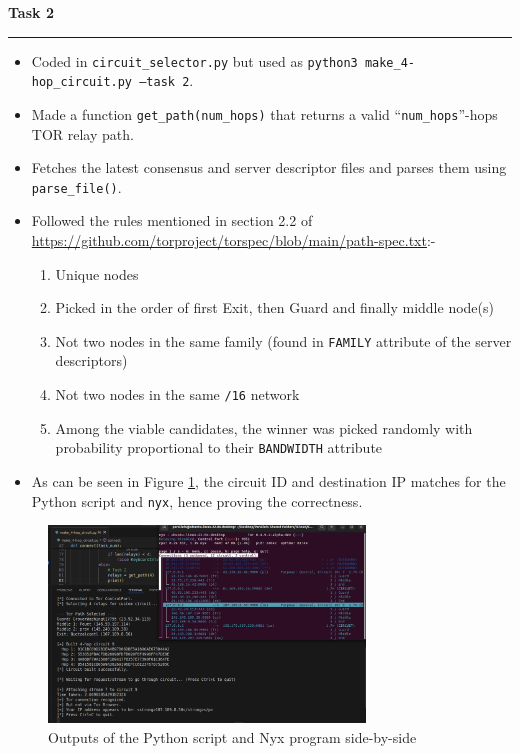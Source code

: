 \documentclass[a4paper,12pt]{article}
\newenvironment{solution}[2][]{%
\begin{mdframed}[linecolor=blue!70!black, linewidth=2pt, roundcorner=10pt, backgroundcolor=yellow!10!white, skipabove=12pt, skipbelow=12pt]%
	\textbf{\large #2}
	\par\noindent\rule{\textwidth}{0.4pt}
}{
\end{mdframed}
}
\begin{document}
\begin{solution}{Task 2}
    \begin{itemize}
        \item Coded in \texttt{circuit\_selector.py} but used as \texttt{python3 make\_4-hop\_circuit.py --task 2}.
        \item Made a function \texttt{get\_path(num\_hops)} that returns a valid ``\texttt{num\_hops}''-hops TOR relay path.
        \item Fetches the latest consensus and server descriptor files and parses them using \texttt{parse\_file()}.
        \item Followed the rules mentioned in section 2.2 of \url{https://github.com/torproject/torspec/blob/main/path-spec.txt}:-
        \begin{enumerate}
            \item Unique nodes
            \item Picked in the order of first Exit, then Guard and finally middle node(s)
            \item Not two nodes in the same family (found in \texttt{FAMILY} attribute of the server descriptors)
            \item Not two nodes in the same \texttt{/16} network
            \item Among the viable candidates, the winner was picked randomly with probability proportional to their \texttt{BANDWIDTH} attribute
        \end{enumerate}
        \item As can be seen in Figure \ref{task-2}, the circuit ID and destination IP matches for the Python script and \texttt{nyx}, hence proving the correctness.
    \end{itemize}
    \begin{figure}[H]
        \centering
        \includegraphics[width=0.75\textwidth]{../Task 2.png}
        \caption{Outputs of the Python script and Nyx program side-by-side}
        \label{task-2}
    \end{figure}
\end{solution}
\end{document}
